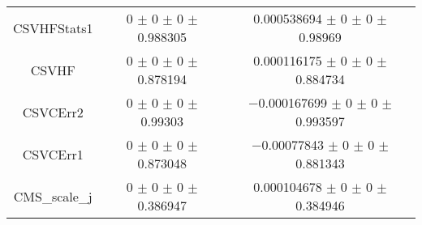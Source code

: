 \begin{table}
\begin{tabular}{ccc}
CSVHFStats1 & \num{0} $\pm$ \num{0} $\pm$ \num{0} $\pm$ \num{0.988305} & \num{0.000538694} $\pm$ \num{0} $\pm$ \num{0} $\pm$ \num{0.98969}\\
CSVHF & \num{0} $\pm$ \num{0} $\pm$ \num{0} $\pm$ \num{0.878194} & \num{0.000116175} $\pm$ \num{0} $\pm$ \num{0} $\pm$ \num{0.884734}\\
CSVCErr2 & \num{0} $\pm$ \num{0} $\pm$ \num{0} $\pm$ \num{0.99303} & \num{-0.000167699} $\pm$ \num{0} $\pm$ \num{0} $\pm$ \num{0.993597}\\
CSVCErr1 & \num{0} $\pm$ \num{0} $\pm$ \num{0} $\pm$ \num{0.873048} & \num{-0.00077843} $\pm$ \num{0} $\pm$ \num{0} $\pm$ \num{0.881343}\\
CMS\_scale\_j & \num{0} $\pm$ \num{0} $\pm$ \num{0} $\pm$ \num{0.386947} & \num{0.000104678} $\pm$ \num{0} $\pm$ \num{0} $\pm$ \num{0.384946}\\
\bottomrule
\end{tabular}
\end{table}